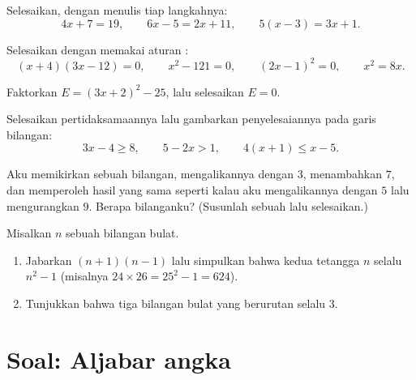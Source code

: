 \begin{exercise}[$\star$]\label{exo:g9:algebra:5}
Selesaikan, dengan menulis tiap langkahnya:
\[
4x + 7 = 19, \qquad
6x - 5 = 2x + 11, \qquad
5(x - 3) = 3x + 1 .
\]
\end{exercise}

\begin{exercise}[$\star\star$]\label{exo:g9:algebra:6}
Selesaikan dengan memakai aturan  :
\[
(x + 4)(3x - 12) = 0, \qquad
x^2 - 121 = 0, \qquad
(2x - 1)^2 = 0, \qquad
x^2 = 8x .
\]
\end{exercise}

\begin{exercise}[$\star\star$]\label{exo:g9:algebra:7}
Faktorkan $E = (3x + 2)^2 - 25$, lalu selesaikan $E = 0$.
\end{exercise}

\begin{exercise}[$\star\star$]\label{exo:g9:algebra:8}
Selesaikan pertidaksamaannya lalu gambarkan penyelesaiannya pada garis bilangan:
\[
3x - 4 \geq 8, \qquad
5 - 2x > 1, \qquad
4(x + 1) \leq x - 5 .
\]
\end{exercise}

\begin{exercise}[$\star\star$]\label{exo:g9:algebra:9}
Aku memikirkan sebuah bilangan, mengalikannya dengan $3$, menambahkan
$7$, dan memperoleh hasil yang sama seperti kalau aku mengalikannya
dengan $5$ lalu mengurangkan $9$. Berapa bilanganku? (Susunlah sebuah
 lalu selesaikan.)
\end{exercise}

\begin{exercise}[$\star\star\star$]\label{exo:g9:algebra:10}
Misalkan $n$ sebuah bilangan bulat.
\begin{enumerate}
  \item Jabarkan $(n + 1)(n - 1)$ lalu simpulkan bahwa 
        kedua tetangga $n$ selalu $n^2 - 1$ (misalnya
        $24 \times 26 = 25^2 - 1 = 624$).
  \item Tunjukkan bahwa  tiga bilangan bulat yang berurutan
        selalu  $3$.
\end{enumerate}
\end{exercise}

\section{Soal: Aljabar angka}

